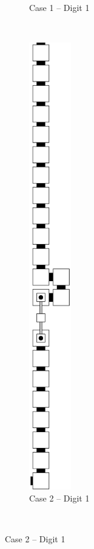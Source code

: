 \begin{enumerate}[label={--}]
\begin{figure}[H]
\begin{subfigure}[t]{0.2\textwidth}
                        \caption{\label{fig:warping/post_warp_case1_digit1_msr} Case 1 -- Digit 1}
                    \end{subfigure}%
                    ~
                    \begin{subfigure}[t]{0.2\textwidth}
                        \centering
                        \includegraphics[width=0.2\textwidth]{warping/post_warp_case2_digit1_msr}
                        \caption{\label{fig:warping/post_warp_case2_digit1_msr} Case 2 -- Digit 1}
                    \end{subfigure}%
                    ~


\end{figure}
\end{enumerate}
